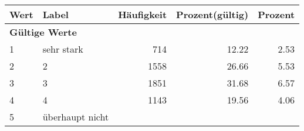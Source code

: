      \begin{longtable}{lXrrr}
     \toprule
     \textbf{Wert} & \textbf{Label} & \textbf{Häufigkeit} & \textbf{Prozent(gültig)} & \textbf{Prozent} \\
     \endhead
     \midrule
     \multicolumn{5}{l}{\textbf{Gültige Werte}}\\

     1 &
     \multicolumn{1}{X}{ sehr stark   } &


       \num{714} &
       \num[round-mode=places,round-precision=2]{12,22} &
         \num[round-mode=places,round-precision=2]{2,53} \\

     2 &
     \multicolumn{1}{X}{ 2   } &


       \num{1558} &
       \num[round-mode=places,round-precision=2]{26,66} &
         \num[round-mode=places,round-precision=2]{5,53} \\

     3 &
     \multicolumn{1}{X}{ 3   } &


       \num{1851} &
       \num[round-mode=places,round-precision=2]{31,68} &
         \num[round-mode=places,round-precision=2]{6,57} \\

     4 &
     \multicolumn{1}{X}{ 4   } &


       \num{1143} &
       \num[round-mode=places,round-precision=2]{19,56} &
         \num[round-mode=places,round-precision=2]{4,06} \\

     5 &
     \multicolumn{1}{X}{ überhaupt nicht   } &



\end{longtable}
